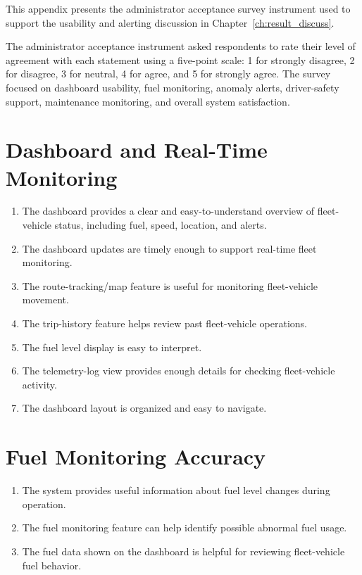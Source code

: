 This appendix presents the administrator acceptance survey instrument used to support the usability and alerting discussion in Chapter~\ref{ch:result_discuss}.

The administrator acceptance instrument asked respondents to rate their level of agreement with each statement using a five-point scale: 1 for strongly disagree, 2 for disagree, 3 for neutral, 4 for agree, and 5 for strongly agree. The survey focused on dashboard usability, fuel monitoring, anomaly alerts, driver-safety support, maintenance monitoring, and overall system satisfaction.

\section{Dashboard and Real-Time Monitoring}

\begin{enumerate}
    \item The dashboard provides a clear and easy-to-understand overview of fleet-vehicle status, including fuel, speed, location, and alerts.
    \item The dashboard updates are timely enough to support real-time fleet monitoring.
    \item The route-tracking/map feature is useful for monitoring fleet-vehicle movement.
    \item The trip-history feature helps review past fleet-vehicle operations.
    \item The fuel level display is easy to interpret.
    \item The telemetry-log view provides enough details for checking fleet-vehicle activity.
    \item The dashboard layout is organized and easy to navigate.
\end{enumerate}

\section{Fuel Monitoring Accuracy}

\begin{enumerate}
    \item The system provides useful information about fuel level changes during operation.
    \item The fuel monitoring feature can help identify possible abnormal fuel usage.
    \item The fuel data shown on the dashboard is helpful for reviewing fleet-vehicle fuel behavior.
\end{enumerate}

